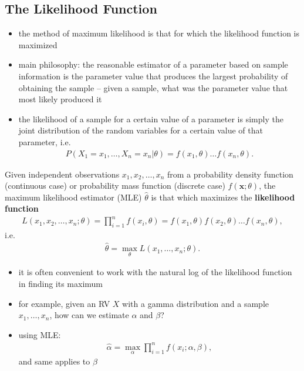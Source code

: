 \documentclass[10pt]{article}
\begin{document}
\subsection{The Likelihood Function}
\begin{itemize}
    \item the method of maximum likelihood is that for which the likelihood function is maximized
    \item main philosophy: the reasonable estimator of a parameter based on sample information is the parameter value that produces the largest probability of obtaining the sample -- given a sample, what was the parameter value that most likely produced it
    \item the likelihood of a sample for a certain value of a parameter is simply the joint distribution of the random variables for a certain value of that parameter, i.e.
        \begin{gather*}
            P(X_1 = x_1, \ldots, X_n = x_n | \theta) = f(x_1, \theta)\ldots f(x_n, \theta)
        .\end{gather*}
\end{itemize}
\begin{definition}
    Given independent observations $x_1, x_2, \ldots, x_n$ from a probability density function (continuous case) or probability mass function (discrete case) $f(\bm{x};\theta)$, the maximum likelihood estimator (MLE) $\hat{\theta}$ is that which maximizes the \textbf{likelihood function} 
    \begin{gather*}
        L(x_1, x_2, \ldots, x_n; \theta) = \prod_{i=1}^{n} f(x_i, \theta)  = f(x_1, \theta)f(x_2,\theta)\ldots f(x_n, \theta)
    ,\end{gather*}
    i.e.
    \begin{gather*}
        \hat{\theta} = \max_{\theta} L(x_1, \ldots, x_n; \theta)
    .\end{gather*}
\end{definition}
\begin{itemize}
    \item it is often convenient to work with the natural log of the likelihood function in finding its maximum
    \item for example, given an RV $X$ with a gamma distribution and a sample $x_1, \ldots, x_n$, how can we estimate  $\alpha$ and $\beta$? 
    \item using MLE:
        \begin{gather*}
            \hat{\alpha} = \max_{\alpha} \prod_{i=1}^{n} f(x_i; \alpha, \beta) 
        ,\end{gather*}
        and same applies to $\beta$
\end{itemize}
\end{document}

